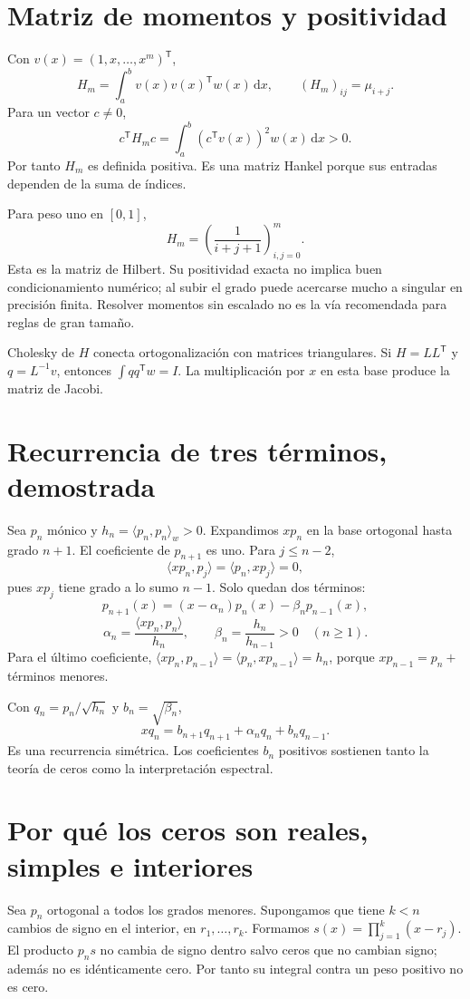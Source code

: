 \documentclass[11pt,a4paper]{article}
\newcommand{\dd}{\,\mathrm d}
\newcommand{\T}{^{\mathsf T}}
\theoremstyle{definition}
\begin{document}
\section{Matriz de momentos y positividad}
Con $v(x)=(1,x,\ldots,x^m)\T$,
\[
H_m=\int_a^b v(x)v(x)\T w(x)\dd x,\qquad
(H_m)_{ij}=\mu_{i+j}.
\]
Para un vector $c\ne0$,
\[
c\T H_mc=\int_a^b(c\T v(x))^2w(x)\dd x>0.
\]
Por tanto $H_m$ es definida positiva. Es una matriz Hankel porque sus entradas dependen de la suma de índices.

Para peso uno en $[0,1]$,
\[
H_m=\left(\frac1{i+j+1}\right)_{i,j=0}^m.
\]
Esta es la matriz de Hilbert. Su positividad exacta no implica buen condicionamiento numérico; al subir el grado puede acercarse mucho a singular en precisión finita. Resolver momentos sin escalado no es la vía recomendada para reglas de gran tamaño.

Cholesky de $H$ conecta ortogonalización con matrices triangulares. Si $H=LL\T$ y $q=L^{-1}v$, entonces $\int qq\T w=I$. La multiplicación por $x$ en esta base produce la matriz de Jacobi.

\section{Recurrencia de tres términos, demostrada}
Sea $p_n$ mónico y $h_n=\langle p_n,p_n\rangle_w>0$. Expandimos $xp_n$ en la base ortogonal hasta grado $n+1$. El coeficiente de $p_{n+1}$ es uno. Para $j\le n-2$,
\[
\langle xp_n,p_j\rangle=\langle p_n,xp_j\rangle=0,
\]
pues $xp_j$ tiene grado a lo sumo $n-1$. Solo quedan dos términos:
\[
p_{n+1}(x)=(x-\alpha_n)p_n(x)-\beta_np_{n-1}(x),
\]
\[
\alpha_n=\frac{\langle xp_n,p_n\rangle}{h_n},\qquad
\beta_n=\frac{h_n}{h_{n-1}}>0\quad(n\ge1).
\]
Para el último coeficiente, $\langle xp_n,p_{n-1}\rangle=
\langle p_n,xp_{n-1}\rangle=h_n$, porque $xp_{n-1}=p_n+$ términos menores.

Con $q_n=p_n/\sqrt{h_n}$ y $b_n=\sqrt{\beta_n}$,
\[
xq_n=b_{n+1}q_{n+1}+\alpha_nq_n+b_nq_{n-1}.
\]
Es una recurrencia simétrica. Los coeficientes $b_n$ positivos sostienen tanto la teoría de ceros como la interpretación espectral.

\section{Por qué los ceros son reales, simples e interiores}
Sea $p_n$ ortogonal a todos los grados menores. Supongamos que tiene $k<n$ cambios de signo en el interior, en $r_1,\ldots,r_k$. Formamos $s(x)=\prod_{j=1}^k(x-r_j)$. El producto $p_ns$ no cambia de signo dentro salvo ceros que no cambian signo; además no es idénticamente cero. Por tanto su integral contra un peso positivo no es cero.
\end{document}
